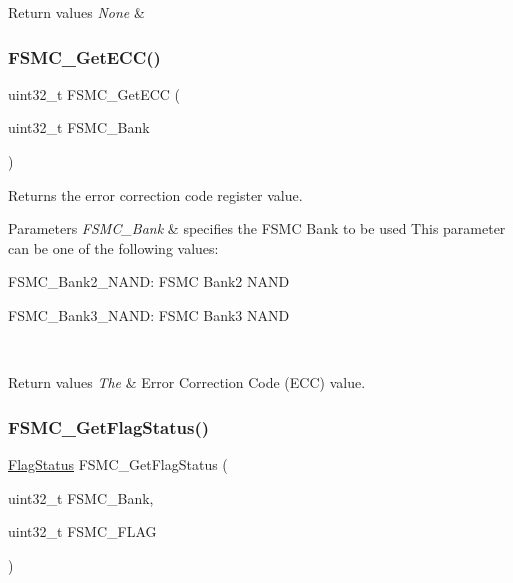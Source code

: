 \begin{DoxyRetVals}{Return values}
{\em None} & \\
\hline
\end{DoxyRetVals}
\mbox{\label{group___f_s_m_c___exported___functions_gaad6d4f5b5a41684ce053fea55bdb98d8}} 
\subsubsection{\texorpdfstring{FSMC\_GetECC()}{FSMC\_GetECC()}}
{\footnotesize\ttfamily uint32\+\_\+t F\+S\+M\+C\+\_\+\+Get\+E\+CC (\begin{DoxyParamCaption}\item[{uint32\+\_\+t}]{F\+S\+M\+C\+\_\+\+Bank }\end{DoxyParamCaption})}



Returns the error correction code register value. 


\begin{DoxyParams}{Parameters}
{\em F\+S\+M\+C\+\_\+\+Bank} & specifies the F\+S\+MC Bank to be used This parameter can be one of the following values\+: \begin{DoxyItemize}
\item F\+S\+M\+C\+\_\+\+Bank2\+\_\+\+N\+A\+ND\+: F\+S\+MC Bank2 N\+A\+ND \item F\+S\+M\+C\+\_\+\+Bank3\+\_\+\+N\+A\+ND\+: F\+S\+MC Bank3 N\+A\+ND \end{DoxyItemize}
\\
\hline
\end{DoxyParams}

\begin{DoxyRetVals}{Return values}
{\em The} & Error Correction Code (E\+CC) value. \\
\hline
\end{DoxyRetVals}
\mbox{\label{group___f_s_m_c___exported___functions_gae00355115b078f483f0771057bb849c4}} 
\subsubsection{\texorpdfstring{FSMC\_GetFlagStatus()}{FSMC\_GetFlagStatus()}}
{\footnotesize\ttfamily \mbox{\hyperlink{group___exported__types_ga89136caac2e14c55151f527ac02daaff}{Flag\+Status}} F\+S\+M\+C\+\_\+\+Get\+Flag\+Status (\begin{DoxyParamCaption}\item[{uint32\+\_\+t}]{F\+S\+M\+C\+\_\+\+Bank,  }\item[{uint32\+\_\+t}]{F\+S\+M\+C\+\_\+\+F\+L\+AG }\end{DoxyParamCaption})}



